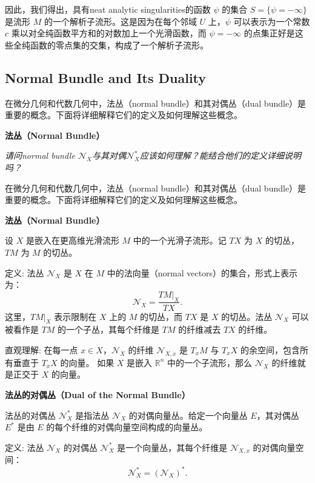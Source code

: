 \documentclass[lang=cn,12pt,a4paper,fontset=none]{beautybook}
\begin{document}
因此，我们得出，具有neat analytic singularities的函数 \(\psi\) 的集合 \( S = \{ \psi = -\infty \} \) 是流形 \(M\) 的一个解析子流形。这是因为在每个邻域 \(U\) 上，\(\psi\) 可以表示为一个常数 \(c\) 乘以对全纯函数平方和的对数加上一个光滑函数，而 \(\psi = -\infty\) 的点集正好是这些全纯函数的零点集的交集，构成了一个解析子流形。

\subsection{Normal Bundle and Its Duality}

在微分几何和代数几何中，法丛（normal bundle）和其对偶丛（dual bundle）是重要的概念。下面将详细解释它们的定义及如何理解这些概念。

\textbf{法丛（Normal Bundle）}

\textit{请问normal bundle $\mathcal{N}_X$与其对偶$\mathcal{N}_X^*$应该如何理解？能结合他们的定义详细说明吗？}


在微分几何和代数几何中，法丛（normal bundle）和其对偶丛（dual bundle）是重要的概念。下面将详细解释它们的定义及如何理解这些概念。

\textbf{法丛（Normal Bundle）}

设 \( X \) 是嵌入在更高维光滑流形 \( M \) 中的一个光滑子流形。记 \( TX \) 为 \( X \) 的切丛，\( TM \) 为 \( M \) 的切丛。

定义: 法丛 \( \mathcal{N}_X \) 是 \( X \) 在 \( M \) 中的法向量（normal vectors）的集合，形式上表示为：
\[
\mathcal{N}_X = \frac{TM|_X}{TX}.
\]
这里，\( TM|_X \) 表示限制在 \( X \) 上的 \( M \) 的切丛，而 \( TX \) 是 \( X \) 的切丛。法丛 \( \mathcal{N}_X \) 可以被看作是 \( TM \) 的一个子丛，其每个纤维是 \( TM \) 的纤维减去 \( TX \) 的纤维。

直观理解:
在每一点 \( x \in X \)，\( \mathcal{N}_X \) 的纤维 \( \mathcal{N}_{X,x} \) 是 \( T_x M \) 与 \( T_x X \) 的余空间，包含所有垂直于 \( T_x X \) 的向量。
如果 \( X \) 是嵌入 \( \mathbb{R}^n \) 中的一个子流形，那么 \( \mathcal{N}_X \) 的纤维就是正交于 \( X \) 的向量。

\textbf{法丛的对偶丛（Dual of the Normal Bundle）}

法丛的对偶丛 \( \mathcal{N}_X^* \) 是指法丛 \( \mathcal{N}_X \) 的对偶向量丛。给定一个向量丛 \( E \)，其对偶丛 \( E^* \) 是由 \( E \) 的每个纤维的对偶向量空间构成的向量丛。

定义: 法丛 \( \mathcal{N}_X \) 的对偶丛 \( \mathcal{N}_X^* \) 是一个向量丛，其每个纤维是 \( \mathcal{N}_{X,x} \) 的对偶向量空间：
\[
\mathcal{N}_X^* = (\mathcal{N}_X)^*.
\]
\end{document}
